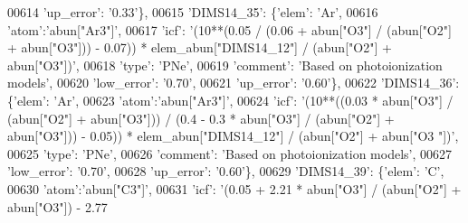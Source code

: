 \begin{DoxyCode}
00614                                        \textcolor{stringliteral}{'up\_error'}: \textcolor{stringliteral}{'0.33'}\},
00615                          \textcolor{stringliteral}{'DIMS14\_35'}: \{\textcolor{stringliteral}{'elem'}: \textcolor{stringliteral}{'Ar'},
00616                                        \textcolor{stringliteral}{'atom'}:\textcolor{stringliteral}{'abun["Ar3"]'}, 
00617                                        \textcolor{stringliteral}{'icf'}: \textcolor{stringliteral}{'(10**(0.05 / (0.06 + abun["O3"] / (abun["O2"] + abun["O3"]))
       - 0.07)) * elem\_abun["DIMS14\_12"] / (abun["O2"] + abun["O3"])'},
00618                                        \textcolor{stringliteral}{'type'}: \textcolor{stringliteral}{'PNe'},
00619                                        \textcolor{stringliteral}{'comment'}: \textcolor{stringliteral}{'Based on photoionization models'},
00620                                        \textcolor{stringliteral}{'low\_error'}: \textcolor{stringliteral}{'0.70'},
00621                                        \textcolor{stringliteral}{'up\_error'}: \textcolor{stringliteral}{'0.60'}\},
00622                          \textcolor{stringliteral}{'DIMS14\_36'}: \{\textcolor{stringliteral}{'elem'}: \textcolor{stringliteral}{'Ar'},
00623                                        \textcolor{stringliteral}{'atom'}:\textcolor{stringliteral}{'abun["Ar3"]'}, 
00624                                        \textcolor{stringliteral}{'icf'}: \textcolor{stringliteral}{'(10**((0.03  * abun["O3"] / (abun["O2"] + abun["O3"])) /
       (0.4 - 0.3 * abun["O3"] / (abun["O2"] + abun["O3"])) - 0.05)) * elem\_abun["DIMS14\_12"] / (abun["O2"] + abun["O3
      "])'},
00625                                        \textcolor{stringliteral}{'type'}: \textcolor{stringliteral}{'PNe'},
00626                                        \textcolor{stringliteral}{'comment'}: \textcolor{stringliteral}{'Based on photoionization models'},
00627                                        \textcolor{stringliteral}{'low\_error'}: \textcolor{stringliteral}{'0.70'},
00628                                        \textcolor{stringliteral}{'up\_error'}: \textcolor{stringliteral}{'0.60'}\},
00629                          \textcolor{stringliteral}{'DIMS14\_39'}: \{\textcolor{stringliteral}{'elem'}: \textcolor{stringliteral}{'C'},
00630                                        \textcolor{stringliteral}{'atom'}:\textcolor{stringliteral}{'abun["C3"]'}, 
00631                                        \textcolor{stringliteral}{'icf'}: \textcolor{stringliteral}{'(0.05 + 2.21 * abun["O3"] / (abun["O2"] + abun["O3"]) - 2.77
}
\end{DoxyCode}
